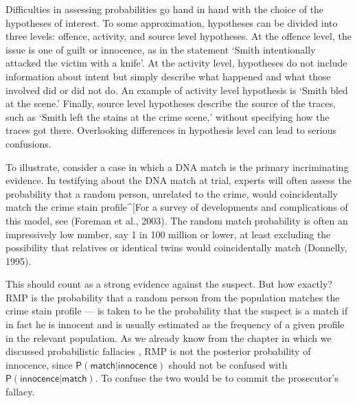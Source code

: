 \documentclass[10pt,dvipsnames,enabledeprecatedfontcommands]{scrartcl}
\newcommand{\pr}[1]{\mathsf{P}(#1)}
\begin{document}
Difficulties in assessing probabilities go hand in hand with the choice
of the hypotheses of interest. To some approximation, hypotheses can be
divided into three levels: offence, activity, and source level
hypotheses. At the offence level, the issue is one of guilt or
innocence, as in the statement `Smith intentionally attacked the victim
with a knife'. At the activity level, hypotheses do not include
information about intent but simply describe what happened and what
those involved did or did not do. An example of activity level
hypothesis is `Smith bled at the scene.' Finally, source level
hypotheses describe the source of the traces, such as `Smith left the
stains at the crime scene,' without specifying how the traces got there.
Overlooking differences in hypothesis level can lead to serious
confusions.

To illustrate, consider a case in which a DNA match is the primary
incriminating evidence. In testifying about the DNA match at trial,
experts will often assess the probability that a random person,
unrelated to the crime, would coincidentally match the crime stain
profile\^{}{[}For a survey of developments and complications of this
model, see (Foreman et al., 2003). The random match probability is often
an impressively low number, say 1 in 100 million or lower, at least
excluding the possibility that relatives or identical twins would
coincidentally match (Donnelly, 1995).

This should count as a strong evidence against the suspect. But how
exactly? RMP is the probability that a random person from the population
matches the crime stain profile --- is taken to be the probability that
the suspect is a match if in fact he is innocent and is usually
estimated as the frequency of a given profile in the relevant
population. As we already know from the chapter in which we discussed
probabilistic fallacies , RMP is not the posterior
probability of innocence, since
\(\pr{\textsf{match} \vert \textsf{innocence}}\) should not be confused
with \(\pr{\textsf{innocence} \vert \textsf{match}}\). To confuse the
two would be to commit the prosecutor's fallacy.
\end{document}
